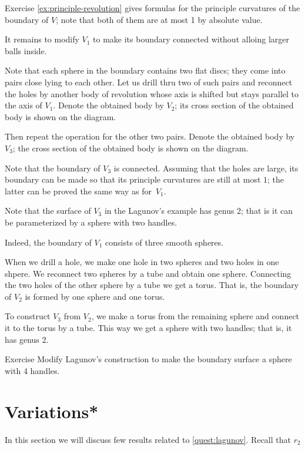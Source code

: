 Exercise \ref{ex:principle-revolution} gives formulas for the principle curvatures of the boundary of $V$;
note that both of them are at most 1 by absolute value.  

It remains to modify $V_1$ to make its boundary connected without  alloing larger balls inside.

Note that each sphere in the boundary contains two flat discs;
they come into pairs close lying to each other. 
Let us drill thru two of such pairs and reconnect the holes by another body of revolution whose 
axis is shifted but stays parallel to the axis of $V_1$.
Denote the obtained body by $V_2$; its cross section of the obtained body is shown on the diagram. 

Then repeat the operation for the other two pairs.
Denote the obtained body by $V_3$; the cross section of the obtained body is shown on the diagram.

Note that the boundary of $V_3$ is connected.
Assuming that the holes are large, its boundary can be made so that its principle curvatures are still at most $1$; the latter can be proved the same way as for~$V_1$.
\qeds


Note that the surface of $V_3$ in the Lagunov's example has genus 2; that is it can be parameterized by a sphere with two handles.

Indeed, the boundary of $V_1$ consists of three smooth spheres.

When we drill a hole, we make one hole in two spheres and two holes in one shpere.
We reconnect two spheres by a tube and obtain one sphere.
Connecting the two holes of the other sphere by a tube we get a torus.
That is, the boundary of $V_2$ is formed by one sphere and one torus.

To construct $V_3$ from $V_2$, we make a torus from the remaining sphere and connect it to the torus by a tube.
This way we get a sphere with two handles; that is, it has genus 2.

\begin{thm}{Exercise}\label{ex:lagunov-genus4}
Modify Lagunov's construction to make the boundary surface a sphere with 4 handles.
\end{thm}

\section*{Variations*}

In this section we will discuss few results related to \ref{quest:lagunov}.
Recall that $r_2$

